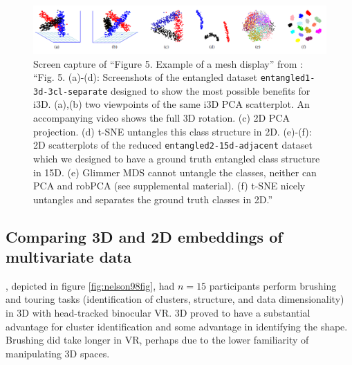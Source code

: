 \documentclass{monashthesis}
\begin{document}
\begin{figure}

{\centering \includegraphics[width=1\linewidth]{./figures/sedlmair13fig} 

}

\caption{Screen capture of ``Figure 5. Example of a mesh
display'' from \textcite{sedlmair_empirical_2013}: ``Fig. 5. (a)-(d):
Screenshots of the entangled dataset \texttt{entangled1-3d-3cl-separate}
designed to show the most possible benefits for i3D. (a),(b) two
viewpoints of the same i3D PCA scatterplot. An accompanying video shows
the full 3D rotation. (c) 2D PCA projection. (d) t-SNE untangles this
class structure in 2D. (e)-(f): 2D scatterplots of the reduced
\texttt{entangled2-15d-adjacent} dataset which we designed to have a
ground truth entangled class structure in 15D. (e) Glimmer MDS cannot
untangle the classes, neither can PCA and robPCA (see supplemental
material). (f) t-SNE nicely untangles and separates the ground truth
classes in 2D.''}\label{fig:sedlmair13fig}
\end{figure}

\subsection{Comparing 3D and 2D embeddings of multivariate
data}\label{comparing-3d-and-2d-embeddings-of-multivariate-data}

\textcite{nelson_xgobi_1998}, depicted in figure \ref{fig:nelson98fig},
had \(n=15\) participants perform brushing and touring tasks
(identification of clusters, structure, and data dimensionality) in 3D
with head-tracked binocular VR. 3D proved to have a substantial
advantage for cluster identification and some advantage in identifying
the shape. Brushing did take longer in VR, perhaps due to the lower
familiarity of manipulating 3D spaces.
\end{document}
